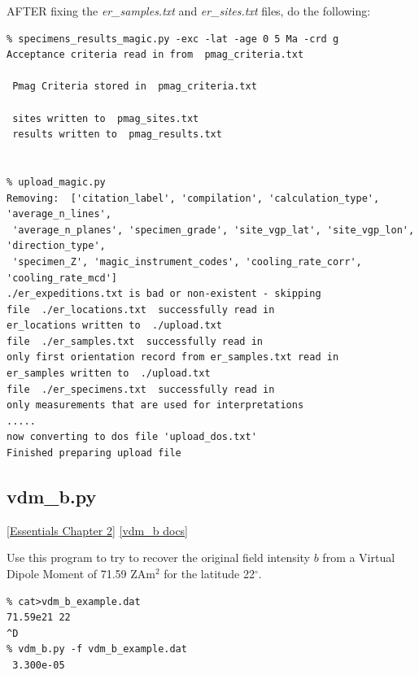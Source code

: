 \documentclass[11pt]{book}
\begin{document}
{AFTER fixing the {\it er\_samples.txt} and {\it er\_sites.txt} files, do the following:



\begin{verbatim}
% specimens_results_magic.py -exc -lat -age 0 5 Ma -crd g
Acceptance criteria read in from  pmag_criteria.txt

 Pmag Criteria stored in  pmag_criteria.txt

 sites written to  pmag_sites.txt
 results written to  pmag_results.txt


% upload_magic.py
Removing:  ['citation_label', 'compilation', 'calculation_type', 'average_n_lines',
 'average_n_planes', 'specimen_grade', 'site_vgp_lat', 'site_vgp_lon', 'direction_type',
 'specimen_Z', 'magic_instrument_codes', 'cooling_rate_corr', 'cooling_rate_mcd']
./er_expeditions.txt is bad or non-existent - skipping
file  ./er_locations.txt  successfully read in
er_locations written to  ./upload.txt
file  ./er_samples.txt  successfully read in
only first orientation record from er_samples.txt read in
er_samples written to  ./upload.txt
file  ./er_specimens.txt  successfully read in
only measurements that are used for interpretations
.....
now converting to dos file 'upload_dos.txt'
Finished preparing upload file
\end{verbatim}




%

\subsection{vdm\_b.py}
\href{http://earthref.org/MAGIC/books/Tauxe/Essentials/WebBook3ch2.html#ch2}{[Essentials Chapter 2]}
\href{https://github.com/PmagPy/PmagPy/blob/master/programs/vdm_b.py}{[vdm\_b docs]}


Use this program to try to recover the original field intensity $b$ from a Virtual Dipole Moment of  71.59 ZAm$^2$ for the latitude 22$^{\circ}$.

\begin{verbatim}
% cat>vdm_b_example.dat
71.59e21 22
^D
% vdm_b.py -f vdm_b_example.dat
 3.300e-05
\end{verbatim}

}
\end{document}

